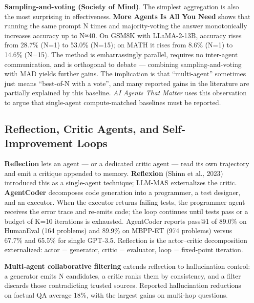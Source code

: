 \documentclass{article}
\begin{document}
\textbf{Sampling-and-voting (Society of Mind)}. The simplest aggregation is also the most surprising in effectiveness. \textbf{More Agents Is All You Need} \citep{li2024asurveyonllmbasedm} shows that running the same prompt N times and majority-voting the answer monotonically increases accuracy up to N≈40. On GSM8K with LLaMA-2-13B, accuracy rises from 28.7\% (N=1) to 53.0\% (N=15); on MATH it rises from 8.6\% (N=1) to 14.6\% (N=15). The method is embarrassingly parallel, requires no inter-agent communication, and is orthogonal to debate --- combining sampling-and-voting with MAD yields further gains. The implication is that ``multi-agent'' sometimes just means ``best-of-N with a vote'', and many reported gains in the literature are partially explained by this baseline. \emph{AI Agents That Matter} \citep{kapoor2024aiagentsthatmatter} uses this observation to argue that single-agent compute-matched baselines must be reported.

\subsection{Reflection, Critic Agents, and Self-Improvement Loops}\label{reflection-critic-agents-and-self-improvement-loops}

\textbf{Reflection} lets an agent --- or a dedicated critic agent --- read its own trajectory and emit a critique appended to memory. \textbf{Reflexion} (Shinn et al., 2023) introduced this as a single-agent technique; LLM-MAS externalizes the critic. \textbf{AgentCoder} \citep{huang2023agentcodermultiage} decomposes code generation into a programmer, a test designer, and an executor. When the executor returns failing tests, the programmer agent receives the error trace and re-emits code; the loop continues until tests pass or a budget of K=10 iterations is exhausted. AgentCoder reports pass@1 of 89.0\% on HumanEval (164 problems) and 89.9\% on MBPP-ET (974 problems) versus 67.7\% and 65.5\% for single GPT-3.5. Reflection is the actor--critic decomposition externalized: actor = generator, critic = evaluator, loop = fixed-point iteration.

\textbf{Multi-agent collaborative filtering} \citep{shi2024mitigatingreasonin} extends reflection to hallucination control: a generator emits N candidates, a critic ranks them by consistency, and a filter discards those contradicting trusted sources. Reported hallucination reductions on factual QA average 18\%, with the largest gains on multi-hop questions.
\end{document}
